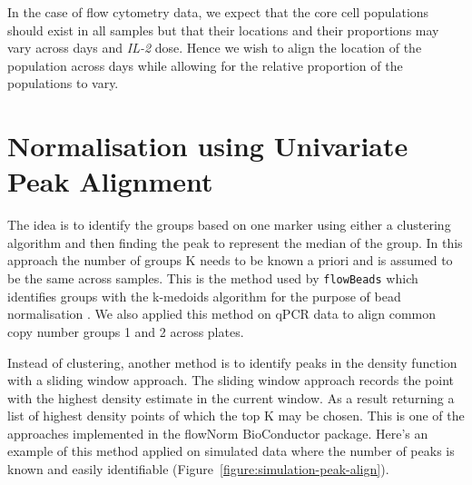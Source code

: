 In the case of flow cytometry data, we expect that the core cell populations should exist in all samples but that their locations and their
proportions may vary across days and \emph{IL-2} dose.
Hence we wish to align the location of the population across days while allowing for the relative proportion of the populations to vary.

\section{Normalisation using Univariate Peak Alignment}

The idea is to identify the groups based on one marker using either a clustering algorithm and then finding the peak to represent the median of the group.
In this approach the number of groups K needs to be known a priori and is assumed to be the same across samples.
This is the method used by \texttt{flowBeads} which identifies groups with the k-medoids algorithm for the purpose of bead normalisation \citep{flowBeads}.
We also applied this method on qPCR data to align common copy number groups 1 and 2 across plates.

Instead of clustering, another method is to identify peaks in the density function with a sliding window approach.
The sliding window approach records the point with the highest density estimate in the current window.
As a result returning a list of highest density points of which the top K may be chosen.
This is one of the approaches implemented in the flowNorm BioConductor package.
Here's an example of this method applied on simulated data where the number of peaks is known and easily identifiable (Figure~\ref{figure:simulation-peak-align}).

